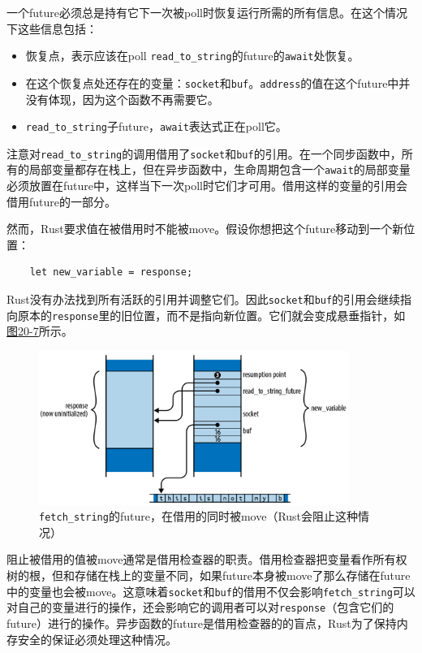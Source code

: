 一个future必须总是持有它下一次被poll时恢复运行所需的所有信息。在这个情况下这些信息包括：
\begin{itemize}
    \item 恢复点，表示应该在poll \texttt{read\_to\_string}的future的\texttt{await}处恢复。
    \item 在这个恢复点处还存在的变量：\texttt{socket}和\texttt{buf}。\texttt{address}的值在这个future中并没有体现，因为这个函数不再需要它。
    \item \texttt{read\_to\_string}子future，\texttt{await}表达式正在poll它。
\end{itemize}

注意对\texttt{read\_to\_string}的调用借用了\texttt{socket}和\texttt{buf}的引用。在一个同步函数中，所有的局部变量都存在栈上，但在异步函数中，生命周期包含一个\texttt{await}的局部变量必须放置在future中，这样当下一次poll时它们才可用。借用这样的变量的引用会借用future的一部分。

然而，Rust要求值在被借用时不能被move。假设你想把这个future移动到一个新位置：
\begin{verbatim}
    let new_variable = response;
\end{verbatim}

Rust没有办法找到所有活跃的引用并调整它们。因此\texttt{socket}和\texttt{buf}的引用会继续指向原本的\texttt{response}里的旧位置，而不是指向新位置。它们就会变成悬垂指针，如\hyperref[f20-7]{图20-7}所示。

\begin{figure}[htbp]
    \centering
    \includegraphics[width=0.9\textwidth]{../img/f20-7.png}
    \caption{\texttt{fetch\_string}的future，在借用的同时被move（Rust会阻止这种情况）}
    \label{f20-7}
\end{figure}

阻止被借用的值被move通常是借用检查器的职责。借用检查器把变量看作所有权树的根，但和存储在栈上的变量不同，如果future本身被move了那么存储在future中的变量也会被move。这意味着\texttt{socket}和\texttt{buf}的借用不仅会影响\texttt{fetch\_string}可以对自己的变量进行的操作，还会影响它的调用者可以对\texttt{response}（包含它们的future）进行的操作。异步函数的future是借用检查器的的盲点，Rust为了保持内存安全的保证必须处理这种情况。


